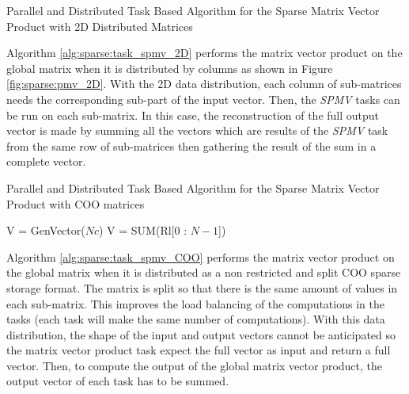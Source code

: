 \begin{algorithm}[h]
	\DontPrintSemicolon
	\caption{Parallel and Distributed Task Based Algorithm for the Sparse  Matrix Vector Product with 2D Distributed Matrices \label{alg:sparse:task_spmv_2D}}
	\;
	\;
\end{algorithm}

Algorithm \ref{alg:sparse:task_spmv_2D} performs the matrix vector product on the global matrix when it is distributed by columns as shown in Figure \ref{fig:sparse:pmv_2D}.
With the 2D data distribution, each column of sub-matrices needs the corresponding sub-part of the input vector.
Then, the \textit{SPMV} tasks can be run on each sub-matrix.
In this case, the reconstruction of the full output vector is made by summing all the vectors which are results of the \textit{SPMV} task from the same row of sub-matrices then gathering the result of the sum in a complete vector.

\begin{algorithm}[h]
	\DontPrintSemicolon
	\caption{Parallel and Distributed Task Based Algorithm for the Sparse  Matrix Vector Product with COO matrices \label{alg:sparse:task_spmv_COO}}
	V = GenVector($Nc$)\;
	\;
	\;
	V = SUM(Rl[0 : $N - 1$])\;
\end{algorithm}

Algorithm \ref{alg:sparse:task_spmv_COO} performs the matrix vector product on the global matrix when it is distributed as a non restricted and split COO sparse storage format.
The matrix is split so that there is the same amount of values in each sub-matrix.
This improves the load balancing of the computations in the tasks (each task will make the same number of computations).
With this data distribution, the shape of the input and output vectors cannot be anticipated so the matrix vector product task expect the full vector as input and return a full vector.
Then, to compute the output of the global matrix vector product, the output vector of each task has to be summed.

